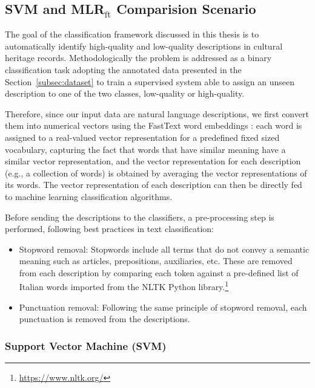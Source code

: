 \documentclass[epsfig,a4paper,12pt,titlepage]{book}
\newcommand{\mlr}{MLR$_\text{ft}$\xspace}
\begin{document}
\subsection{SVM and \mlr Comparision Scenario}

The goal of the classification framework discussed in this thesis is to automatically identify high-quality and low-quality descriptions in cultural heritage records.  Methodologically the problem is addressed  as a binary classification task adopting the annotated data presented in the Section~\ref{subsec:dataset} to train a supervised system able to assign an unseen description to one of the two classes, low-quality or high-quality.

Therefore, since our input data are natural language descriptions, we first convert them into numerical vectors using the FastText word embeddings \cite{fast10}: each word is assigned to a real-valued vector representation for a predefined fixed sized vocabulary, capturing the fact that words that have similar meaning have a similar vector representation, and the vector representation for each description (e.g., a collection of words) is obtained by averaging the vector representations of its words. The vector representation of each description can then be directly fed to machine learning classification algorithms.

Before sending the descriptions to the classifiers, a pre-processing step is performed, following best practices in text classification: 
\begin{itemize}
    \item Stopword removal: Stopwords include all terms that do not convey a semantic meaning such as articles, prepositions, auxiliaries, etc. These are removed from each description by comparing each token against a pre-defined list of Italian words imported from the NLTK Python library.\footnote{\url{https://www.nltk.org/}}
    \item Punctuation removal: Following the same principle of stopword removal, each punctuation is removed from the descriptions.
\end{itemize}
\subsubsection{Support Vector Machine (SVM)}
\end{document}
